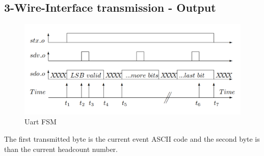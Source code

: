 \documentclass[12pt,a4 paper] {report}
\begin{document}
\subsection*{3-Wire-Interface transmission - Output}
\begin{figure}[h]
	\centering	
	\includegraphics[scale=0.4]{../png/3wireinterface.png}
	\caption{Uart FSM}
\end{figure}

The first transmitted byte is the current event ASCII code and the second byte is than the current headcount number.

\newpage
\end{document}

